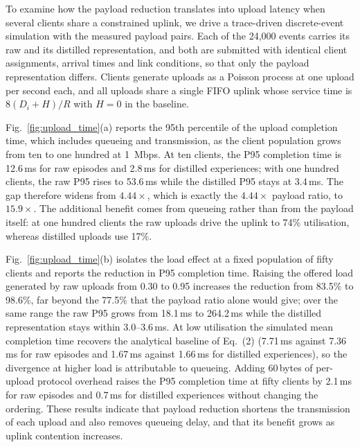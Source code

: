 
To examine how the payload reduction translates into upload latency when several clients share a
constrained uplink, we drive a trace-driven discrete-event simulation with the measured payload pairs.
Each of the 24{,}000 events carries its raw and its distilled representation, and both are submitted
with identical client assignments, arrival times and link conditions, so that only the payload
representation differs. Clients generate uploads as a Poisson process at one upload per second each,
and all uploads share a single FIFO uplink whose service time is $8(D_i+H)/R$ with $H=0$ in the
baseline.

Fig.~\ref{fig:upload_time}(a) reports the 95th percentile of the upload completion time, which includes
queueing and transmission, as the client population grows from ten to one hundred at 1~Mbps. At ten
clients, the P95 completion time is 12.6\,ms for raw episodes and 2.8\,ms for distilled experiences;
with one hundred clients, the raw P95 rises to 53.6\,ms while the distilled P95 stays at 3.4\,ms. The
gap therefore widens from $4.44\times$, which is exactly the $4.44\times$ payload ratio, to
$15.9\times$. The additional benefit comes from queueing rather than from the payload itself: at one
hundred clients the raw uploads drive the uplink to 74\% utilisation, whereas distilled uploads use
17\%.

Fig.~\ref{fig:upload_time}(b) isolates the load effect at a fixed population of fifty clients and
reports the reduction in P95 completion time. Raising the offered load generated by raw uploads from
0.30 to 0.95 increases the reduction from 83.5\% to 98.6\%, far beyond the 77.5\% that the payload ratio
alone would give; over the same range the raw P95 grows from 18.1\,ms to 264.2\,ms while the distilled
representation stays within 3.0--3.6\,ms. At low utilisation the simulated mean completion time recovers
the analytical baseline of Eq.~(2) (7.71\,ms against 7.36\,ms for raw episodes and 1.67\,ms against
1.66\,ms for distilled experiences), so the divergence at higher load is attributable to queueing.
Adding 60\,bytes of per-upload protocol overhead raises the P95 completion time at fifty clients by
2.1\,ms for raw episodes and 0.7\,ms for distilled experiences without changing the ordering. These
results indicate that payload reduction shortens the transmission of each upload and also removes
queueing delay, and that its benefit grows as uplink contention increases.
